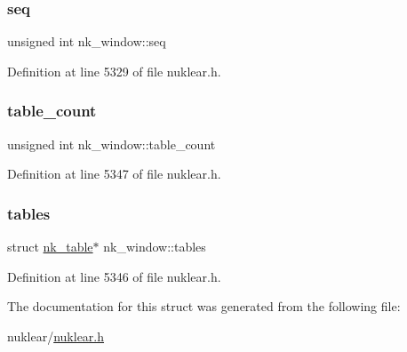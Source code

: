 \subsubsection{\texorpdfstring{seq}{seq}}
{\footnotesize\ttfamily unsigned int nk\+\_\+window\+::seq}



Definition at line 5329 of file nuklear.\+h.

\mbox{\label{structnk__window_a1a2c2bcd90b8f65838f0c4d38f9e3f6d}} 
\subsubsection{\texorpdfstring{table\+\_\+count}{table\_count}}
{\footnotesize\ttfamily unsigned int nk\+\_\+window\+::table\+\_\+count}



Definition at line 5347 of file nuklear.\+h.

\mbox{\label{structnk__window_a5e7118c3d6354cce7d0a6b6ab19f2267}} 
\subsubsection{\texorpdfstring{tables}{tables}}
{\footnotesize\ttfamily struct \mbox{\hyperlink{structnk__table}{nk\+\_\+table}}$\ast$ nk\+\_\+window\+::tables}



Definition at line 5346 of file nuklear.\+h.



The documentation for this struct was generated from the following file\+:\begin{DoxyCompactItemize}
\item 
nuklear/\mbox{\hyperlink{nuklear_8h}{nuklear.\+h}}\end{DoxyCompactItemize}
